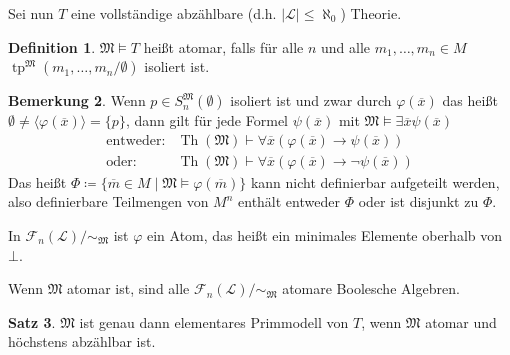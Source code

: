 \documentclass[12pt,parskip=full]{scrartcl}
\newcommand{\abs}[1]{{\left| #1 \right|}}
\theoremstyle{definition}
\newtheorem{theorem}{Satz}[section]
\newtheorem{definition}[theorem]{Definition}
\newtheorem{remark}[theorem]{Bemerkung}
\begin{document}
	Sei nun $T$ eine vollständige abzählbare (d.h. $\abs{\mathcal{L}} \leq \aleph_0$) Theorie.
	
	\begin{definition}
		$\mathfrak{M} \models T$ heißt atomar, falls für alle $n$ und alle $m_1, \dots, m_n \in M$ $\operatorname{tp}^\mathfrak{M}(m_1, \dots, m_n / \emptyset )$ isoliert ist.
	\end{definition}

	\begin{remark}
		Wenn $p \in S_n^\mathfrak{M}(\emptyset)$ isoliert ist und zwar durch $\varphi(\overline{x})$ das heißt $\emptyset \neq \langle \varphi(\overline{x}) \rangle = \{ p \}$, dann gilt für jede Formel $\psi(\overline{x})$ mit $\mathfrak{M} \models \exists
		 \overline{x} \psi(\overline{x})$
		 \begin{align*}
			 \text{entweder:}& \operatorname{Th}(\mathfrak{M}) \vdash \forall \overline{x} ( \varphi(\overline{x}) \to \psi(\overline{x})) \\
			 \text{oder:} & \operatorname{Th}(\mathfrak{M}) \vdash \forall \overline{x} ( \varphi(\overline{x}) \to \lnot \psi(\overline{x}))
		 \end{align*}
		 Das heißt $\Phi \coloneqq \{ \overline{m} \in M \mid \mathfrak{M} \models \varphi(\overline{m}) \}$ kann nicht definierbar aufgeteilt werden, also definierbare Teilmengen von $M^n$ enthält entweder $\Phi$ oder ist disjunkt zu $\Phi$.
		 
		 In $\mathcal{F}_n(\mathcal{L}) / \sim_\mathfrak{M}$ ist $\varphi$ ein Atom, das heißt ein minimales Elemente oberhalb von $\bot$.
		 
		 Wenn $\mathfrak{M}$ atomar ist, sind alle $\mathcal{F}_n(\mathcal{L})/ \sim_\mathfrak{M}$ atomare Boolesche Algebren.
	\end{remark}

	\begin{theorem}
		$\mathfrak{M}$ ist genau dann elementares Primmodell von $T$, wenn $\mathfrak{M}$ atomar und höchstens abzählbar ist.
	\end{theorem}
\end{document}
